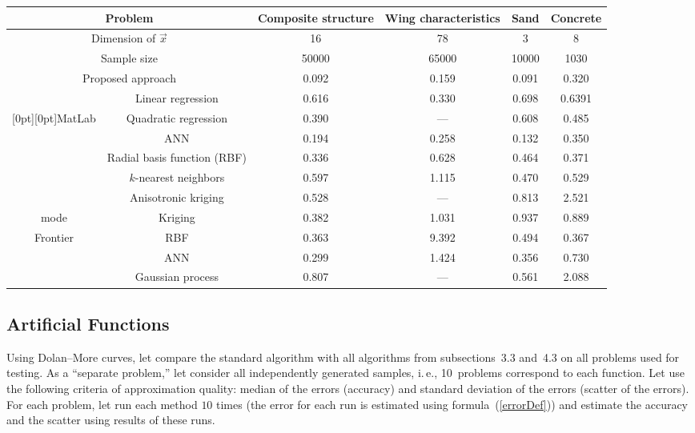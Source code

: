 \begin{multicols}{2}
\begin{table*}[b]
\begin{center}
     \begin{tabular}{cccccc}
      \hline
      \multicolumn{2}{c}{Problem} & Composite structure & Wing characteristics & Sand  & Concrete \\
      \hline
      \multicolumn{2}{c}{Dimension of $\vec x$}   &16 &78 &3  &8\\ 
      \hline
      \multicolumn{2}{c}{Sample size} &50000  &65000  &10000  &1030\\ \hline
              \multicolumn{2}{c}{Proposed approach}
              &{0.092}  &{0.159}    &{0.091} & 0.320\\ 
              \hline
      & Linear regression & 0.616   &0.330      &0.698  &  \hphantom{9}0.6391\\ 
  \multicolumn{1}{c}{\raisebox{-6pt}[0pt][0pt]{MatLab}}     & Quadratic regression
                &0.390      &---      &0.608& 0.485  \\ 
      &ANN      &0.194  &0.258      & 0.132     & 0.350  \\ 
      &Radial basis function (RBF)  &0.336  &0.628      &0.464&     0.371   \\ 
      \hline
      &$k$-nearest neighbors     &0.597      &1.115      &0.470& 0.529   \\ 
      &Anisotronic kriging
        &0.528  & --- & 0.813& 2.521  \\ 
  mode    &Kriging      &0.382 &1.031   &0.937& 0.889  \\ 
Frontier     &RBF          &0.363&9.392        &0.494  &0.367  \\ 
      &ANN
                &0.299      &1.424& 0.356& 0.730  \\ 
      &Gaussian process   
                &0.807      &---      &0.561 & 2.088  \\ 
                \hline
    \end{tabular}
  \end{center}
\end{table*}

\subsection{Artificial Functions}

\noindent
Using Dolan--More curves, let compare the standard algorithm with all algorithms from 
subsections~3.3 and~4.3 on all problems used for testing.
As a ``separate problem,'' let consider all independently generated samples, i.\,e., 
10~problems correspond to each function. Let 
use the following criteria of approximation quality: median of the errors (accuracy) 
and standard deviation of the errors (scatter of the errors). For each problem,
 let run each method $10$ times (the error for each run is estimated using 
 formula~(\ref{errorDef})) and estimate the accuracy and the scatter using results of these 
 runs.
 { %
 
}
\end{multicols}
